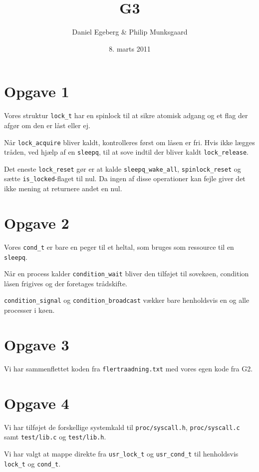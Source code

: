 \documentclass [10pt,a4paper]{article}
\title{G3}
\author{Daniel Egeberg \& Philip Munksgaard}
\date{8. marts 2011}
\begin{document}
\maketitle

\section*{Opgave 1} %

Vores struktur \verb+lock_t+ har en spinlock til at sikre atomisk adgang og et flag der afgør om den er låst eller ej.

Når \verb+lock_acquire+ bliver kaldt, kontrolleres først om låsen er fri. Hvis ikke lægges tråden, ved hjælp af en \verb+sleepq+, til at sove indtil der bliver kaldt \verb+lock_release+.

Det eneste \verb+lock_reset+ gør er at kalde \verb+sleepq_wake_all+, \verb+spinlock_reset+ og sætte \verb+is_locked+-flaget til nul. Da ingen af disse operationer kan fejle giver det ikke mening at returnere andet en nul.


\section*{Opgave 2} %

Vores \verb+cond_t+ er bare en peger til et heltal, som bruges som ressource til en \verb+sleepq+. 

Når en process kalder \verb+condition_wait+ bliver den tilføjet til sovekøen, condition låsen frigives og der foretages trådskifte.

\verb+condition_signal+ og \verb+condition_broadcast+ vækker bare henholdsvis en og alle processer i køen.

\section*{Opgave 3} %

Vi har sammenflettet koden fra \verb+flertraadning.txt+ med vores egen kode fra G2.


\section*{Opgave 4} %

Vi har tilføjet de forskellige systemkald til \verb+proc/syscall.h+, \verb+proc/syscall.c+ samt \verb+test/lib.c+ og \verb+test/lib.h+.

Vi har valgt at mappe direkte fra \verb+usr_lock_t+ og \verb+usr_cond_t+ til henholdsvis \verb+lock_t+ og \verb+cond_t+.

\end{document}

